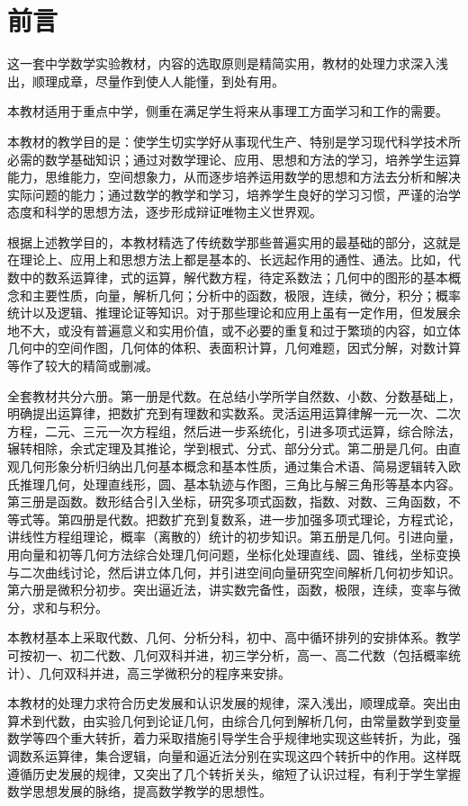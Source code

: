 \chapter{前言}

这一套中学数学实验教材，内容的选取原则是精简实用，教材的处理力求深入浅出，顺理成章，尽量作到使人人能懂，到处有用。

本教材适用于重点中学，侧重在满足学生将来从事理工方面学习和工作的需要。

本教材的教学目的是：使学生切实学好从事现代生产、特别是学习现代科学技术所必需的数学基础知识；通过对数学理论、应用、思想和方法的学习，培养学生运算能力，思维能力，空间想象力，从而逐步培养运用数学的思想和方法去分析和解决实际问题的能力；通过数学的教学和学习，培养学生良好的学习习惯，严谨的治学态度和科学的思想方法，逐步形成辩证唯物主义世界观。

根据上述教学目的，本教材精选了传统数学那些普遍实用的最基础的部分，这就是在理论上、应用上和思想方法上都是基本的、长远起作用的通性、通法。比如，代数中的数系运算律，式的运算，解代数方程，待定系数法；几何中的图形的基本概念和主要性质，向量，解析几何；分析中的函数，极限，连续，微分，积分；概率统计以及逻辑、推理论证等知识。对于那些理论和应用上虽有一定作用，但发展余地不大，或没有普遍意义和实用价值，或不必要的重复和过于繁琐的内容，如立体几何中的空间作图，几何体的体积、表面积计算，几何难题，因式分解，对数计算等作了较大的精简或删减。

全套教材共分六册。第一册是代数。在总结小学所学自然数、小数、分数基础上，明确提出运算律，把数扩充到有理数和实数系。灵活运用运算律解一元一次、二次方程，二元、三元一次方程组，然后进一步系统化，引进多项式运算，综合除法，辗转相除，余式定理及其推论，学到根式、分式、部分分式。第二册是几何。由直观几何形象分析归纳出几何基本概念和基本性质，通过集合术语、简易逻辑转入欧氏推理几何，处理直线形，圆、基本轨迹与作图，三角比与解三角形等基本内容。第三册是函数。数形结合引入坐标，研究多项式函数，指数、对数、三角函数，不等式等。第四册是代数。把数扩充到复数系，进一步加强多项式理论，方程式论，讲线性方程组理论，概率（离散的）统计的初步知识。第五册是几何。引进向量，用向量和初等几何方法综合处理几何问题，坐标化处理直线、圆、锥线，坐标变换与二次曲线讨论，然后讲立体几何，并引进空间向量研究空间解析几何初步知识。第六册是微积分初步。突出逼近法，讲实数完备性，函数，极限，连续，变率与微分，求和与积分。

本教材基本上采取代数、几何、分析分科，初中、高中循环排列的安排体系。教学可按初一、初二代数、几何双科并进，初三学分析，高一、高二代数（包括概率统计）、几何双科并进，高三学微积分的程序来安排。

本教材的处理力求符合历史发展和认识发展的规律，深入浅出，顺理成章。突出由算术到代数，由实验几何到论证几何，由综合几何到解析几何，由常量数学到变量数学等四个重大转折，着力采取措施引导学生合乎规律地实现这些转折，为此，强调数系运算律，集合逻辑，向量和逼近法分别在实现这四个转折中的作用。这样既遵循历史发展的规律，又突出了几个转折关头，缩短了认识过程，有利于学生掌握数学思想发展的脉络，提高数学教学的思想性。

